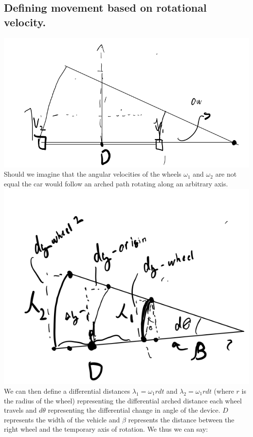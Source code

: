 \documentclass[a4paper,12pt]{article}
\begin{document}
\subsection{Defining movement based on rotational velocity.}
\includegraphics[scale=.75]{rotate.png}\\
Should we imagine that the angular velocities of the wheels $\omega_{1}$ and $\omega_{2}$ are not equal the car would follow an arched path rotating along an arbitrary axis. \\
\includegraphics[scale=.75]{rotatediff.png}\\
We can then define a differential distances $\lambda_{1} = \omega_{1} r dt$ and $\lambda_{2} =\omega_{1} r dt$ (where $r$ is the radius of the wheel) representing the differential arched distance each wheel travels and $d\theta$ representing the differential change in angle of the device. $D$ represents the width of the vehicle and $\beta$ represents the distance between the right wheel and the temporary axis of rotation. We thus we can say:\\\\
\end{document}
